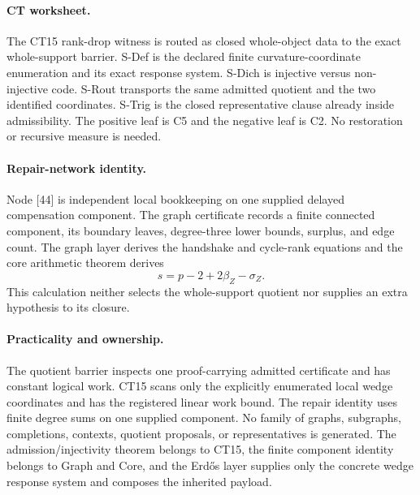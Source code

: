 \paragraph{CT worksheet.}
The CT15 rank-drop witness is routed as closed whole-object data to the exact
whole-support barrier.  S-Def is the declared finite curvature-coordinate
enumeration and its exact response system.  S-Dich is injective versus
non-injective code.  S-Rout transports the same admitted quotient and the two
identified coordinates.  S-Trig is the closed representative clause already
inside admissibility.  The positive leaf is C5 and the negative leaf is C2.
No restoration or recursive measure is needed.

\paragraph{Repair-network identity.}
Node [44] is independent local bookkeeping on one supplied delayed
compensation component.  The graph certificate records a finite connected
component, its boundary leaves, degree-three lower bounds, surplus, and edge
count.  The graph layer derives the handshake and cycle-rank equations and the
core arithmetic theorem derives
\[
s=p-2+2\beta_Z-\sigma_Z.
\]
This calculation neither selects the whole-support quotient nor supplies an
extra hypothesis to its closure.

\paragraph{Practicality and ownership.}
The quotient barrier inspects one proof-carrying admitted certificate and has
constant logical work.  CT15 scans only the explicitly enumerated local wedge
coordinates and has the registered linear work bound.  The repair identity
uses finite degree sums on one supplied component.  No family of graphs,
subgraphs, completions, contexts, quotient proposals, or representatives is
generated.  The admission/injectivity theorem belongs to CT15, the finite
component identity belongs to Graph and Core, and the Erd\H{o}s layer supplies
only the concrete wedge response system and composes the inherited payload.
